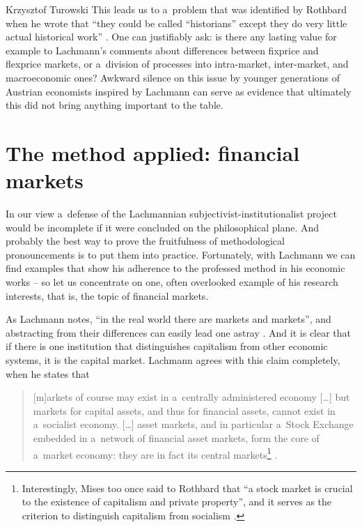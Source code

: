 \begin{artengenv}{Krzysztof Turowski}
This leads us to a~problem that was identified by Rothbard when he wrote that ``they could be called ``historians'' except they do very little actual historical work'' \parencite[53]{rothbard-present}.
One can justifiably ask: is there any lasting value for example to Lachmann's comments about differences between fixprice and flexprice markets, or a~division of processes into intra-market, inter-market, and macroeconomic ones? \parencite[6--14]{lachmann1986market}
Awkward silence on this issue by younger generations of Austrian economists inspired by Lachmann can serve as evidence that ultimately this did not bring anything important to the table.

\section{The method applied: financial markets}
\label{sec:finance}

In our view a~defense of the Lachmannian subjectivist-institutionalist project would be incomplete if it were concluded on the philosophical plane.
And probably the best way to prove the fruitfulness of methodological pronouncements is to put them into practice.
Fortunately, with Lachmann we can find examples that show his adherence to the professed method in his economic works -- so let us concentrate on one, often overlooked example of his research interests, that is, the topic of financial markets.

As Lachmann notes, ``in the real world there are markets and markets'', and abstracting from their differences can easily lead one astray \parencite[263--264]{lachmann-speculative-markets}.
And it is clear that if there is one institution that distinguishes capitalism from other economic systems, it is the capital market.
Lachmann agrees with this claim completely, when he states that
\begin{quote}
[m]arkets of course may exist in a~centrally administered economy [\ldots] but markets for capital assets, and thus for financial assets, cannot exist in a~socialist economy. [\ldots]
asset markets, and in particular a~Stock Exchange embedded in a~network of financial asset markets, form the core of a~market economy: they are in fact its central markets\footnote{Interestingly, Mises too once said to Rothbard that ``a stock market is crucial to the existence of capitalism and private property'', and it serves as the criterion to distinguish capitalism from socialism \parencite[426]{rothbard-stock}.} \parencite[255]{lachmann-monetary}.
\end{quote}


\end{artengenv}

